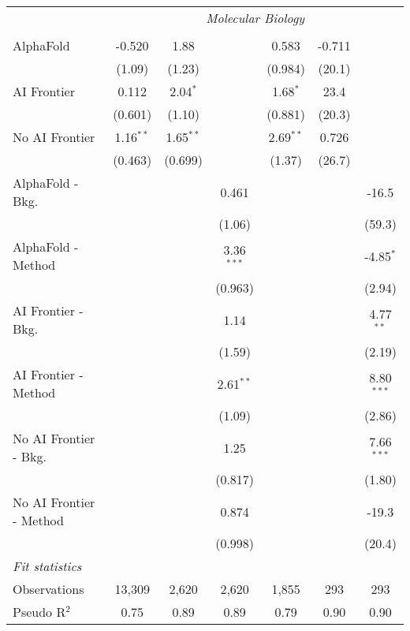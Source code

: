 \begin{tabular}{lcccccc}
 & \multicolumn{6}{c}{\textit{Molecular Biology}} \\ \\
   AlphaFold               & -0.520      & 1.88        &              & 0.583       & -0.711 &   \\   
                           & (1.09)      & (1.23)      &              & (0.984)     & (20.1) &   \\   
   AI Frontier             & 0.112       & 2.04$^{*}$  &              & 1.68$^{*}$  & 23.4   &   \\   
                           & (0.601)     & (1.10)      &              & (0.881)     & (20.3) &   \\   
   No AI Frontier          & 1.16$^{**}$ & 1.65$^{**}$ &              & 2.69$^{**}$ & 0.726  &   \\   
                           & (0.463)     & (0.699)     &              & (1.37)      & (26.7) &   \\   
   AlphaFold - Bkg.        &             &             & 0.461        &             &        & -16.5\\   
                           &             &             & (1.06)       &             &        & (59.3)\\   
   AlphaFold - Method      &             &             & 3.36$^{***}$ &             &        & -4.85$^{*}$\\   
                           &             &             & (0.963)      &             &        & (2.94)\\   
   AI Frontier - Bkg.      &             &             & 1.14         &             &        & 4.77$^{**}$\\   
                           &             &             & (1.59)       &             &        & (2.19)\\   
   AI Frontier - Method    &             &             & 2.61$^{**}$  &             &        & 8.80$^{***}$\\   
                           &             &             & (1.09)       &             &        & (2.86)\\   
   No AI Frontier - Bkg.   &             &             & 1.25         &             &        & 7.66$^{***}$\\   
                           &             &             & (0.817)      &             &        & (1.80)\\   
   No AI Frontier - Method &             &             & 0.874        &             &        & -19.3\\   
                           &             &             & (0.998)      &             &        & (20.4)\\   
   \midrule
   \emph{Fit statistics}\\
   Observations            & 13,309      & 2,620       & 2,620        & 1,855       & 293    & 293\\  
   Pseudo R$^2$            & 0.75        & 0.89        & 0.89         & 0.79        & 0.90   & 0.90\\  
   

\end{tabular}
